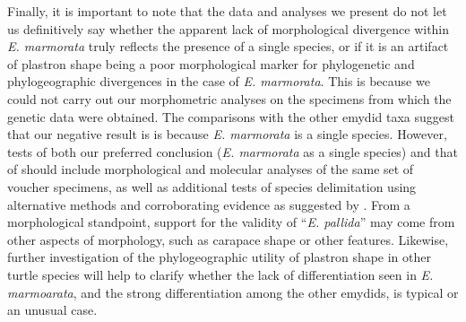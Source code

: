\documentclass[11pt]{article}
\begin{document}
Finally, it is important to note that the data and analyses we present do not let us definitively say whether the apparent lack of morphological divergence within \textit{E. marmorata} truly reflects the presence of a single species, or if it is an artifact of plastron shape being a poor morphological marker for phylogenetic and phylogeographic divergences in the case of \textit{E. marmorata}. This is because we could not carry out our morphometric analyses on the specimens from which the genetic data were obtained. The comparisons with the other emydid taxa suggest that our negative result is is because \textit{E. marmorata} is a single species. However, tests of both our preferred conclusion (\textit{E. marmorata} as a single species) and that of \citet{Spinks2014} should include morphological and molecular analyses of the same set of voucher specimens, as well as additional tests of species delimitation using alternative methods and corroborating evidence as suggested by \citet{Carstens2013}. From a morphological standpoint, support for the validity of ``\textit{E. pallida}'' may come from other aspects of morphology, such as carapace shape or other features. Likewise, further investigation of the phylogeographic utility of plastron shape in other turtle species will help to clarify whether the lack of differentiation seen in \textit{E. marmoarata}, and the strong differentiation among the other emydids, is typical or an unusual case.





\end{document}
